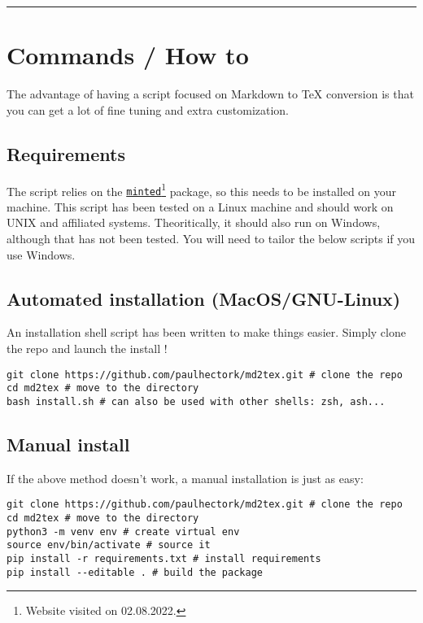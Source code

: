 \documentclass[a4paper, 12pt, twoside]{book}
\begin{document}
\par\noindent\rule{\linewidth}{0.4pt}
\section*{Commands / How to}

The advantage of having a script focused on Markdown to TeX conversion is that you can get a lot of fine tuning
and extra customization.
\subsection*{Requirements}

The script relies on the \href{http://tug.ctan.org/macros/latex/contrib/minted/minted.pdf}{\texttt{minted}}\footnote{Website visited on 02.08.2022.} package,
so this needs to be installed on your machine. This script has been tested on a Linux machine and should
work on UNIX and affiliated systems. Theoritically, it should also run on Windows, although that has not
been tested. You will need to tailor the below scripts if you use Windows.
\subsection*{Automated installation (MacOS/GNU-Linux)}

An installation shell script has been written to make things easier.
Simply clone the repo and launch the install !

\begin{listing}[h!]
   \begin{verbatim}
git clone https://github.com/paulhectork/md2tex.git # clone the repo
cd md2tex # move to the directory
bash install.sh # can also be used with other shells: zsh, ash...

   \end{verbatim}
\end{listing}
\subsection*{Manual install}

If the above method doesn't work, a manual installation is just as easy:

\begin{listing}[h!]
   \begin{verbatim}
git clone https://github.com/paulhectork/md2tex.git # clone the repo
cd md2tex # move to the directory
python3 -m venv env # create virtual env
source env/bin/activate # source it
pip install -r requirements.txt # install requirements
pip install --editable . # build the package

   \end{verbatim}
\end{listing}
\end{document}
